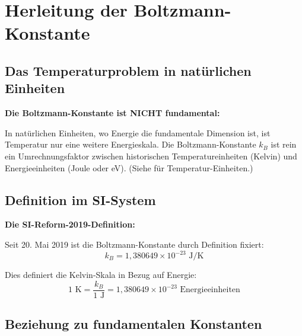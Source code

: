 	\section{Herleitung der Boltzmann-Konstante}
	
	\subsection{Das Temperaturproblem in natürlichen Einheiten}
	
	\begin{warning}
		\textbf{Die Boltzmann-Konstante ist NICHT fundamental:}
		
		In natürlichen Einheiten, wo Energie die fundamentale Dimension ist, ist Temperatur nur eine weitere Energieskala. Die Boltzmann-Konstante $k_B$ ist rein ein Umrechnungsfaktor zwischen historischen Temperatureinheiten (Kelvin) und Energieeinheiten (Joule oder eV). (Siehe \cite{TempEinheitenCMB_De} für Temperatur-Einheiten.)
	\end{warning}
	
	\subsection{Definition im SI-System}
	
	\begin{derivation}
		\textbf{Die SI-Reform-2019-Definition:}
		
		Seit 20. Mai 2019 ist die Boltzmann-Konstante durch Definition fixiert:
		\begin{equation}
			\boxed{k_B = 1{,}380649 \times 10^{-23} \text{ J/K}}
			\label{eq:kb_si}
		\end{equation}
		
		Dies definiert die Kelvin-Skala in Bezug auf Energie:
		\begin{equation}
			1 \text{ K} = \frac{k_B}{1 \text{ J}} = 1{,}380649 \times 10^{-23} \text{ Energieeinheiten}
		\end{equation}
	\end{derivation}
	
	\subsection{Beziehung zu fundamentalen Konstanten}
	
